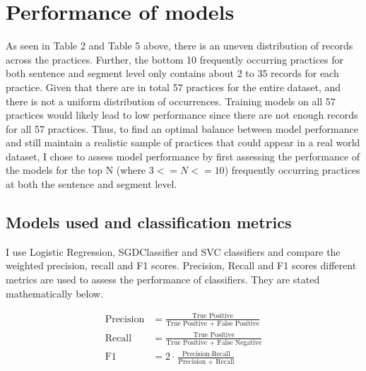 
\chapter{Performance of models} %

\label{Chapter5} %

As seen in Table 2 and Table 5 above, there is an uneven distribution of records across the practices. Further, the bottom 10 frequently occurring practices for both sentence and segment level only contains about 2 to 35 records for each practice. Given that there are in total 57 practices for the entire dataset, and there is not a uniform distribution of occurrences. Training models on all 57 practices would likely lead to low performance since there are not enough records for all 57 practices. Thus, to find an optimal balance between model performance and still maintain a realistic sample of practices that could appear in a real world dataset, I chose to assess model performance by first assessing the performance of the models for the top N (where $3<= N <= 10$) frequently occurring practices at both the sentence and segment level.


\section{Models used and classification metrics}

I use Logistic Regression, SGDClassifier and SVC classifiers and compare the weighted precision, recall and F1 scores. Precision, Recall and F1 scores different metrics are used to assess the performance of classifiers. They are stated mathematically below.

\begin{align*}
	\text{Precision} &= \frac{\text{True Positive}}{\text{True Positive + False Positive}} \\
	\text{Recall} &= \frac{\text{True Positive}}{\text{True Positive + False Negative}} \\
	\text{F1} &= 2 \cdot \frac{\text{Precision} \cdot \text{Recall}}{\text{Precision + Recall}}
\end{align*}

